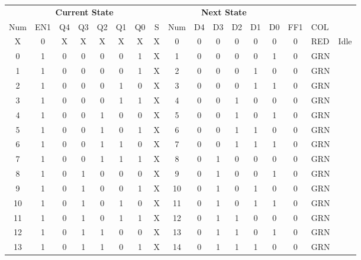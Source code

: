 \begin{table*}
\begin{tabularx}{\linewidth}{ c c c c c c c c | c c c c c c | c l l}
  \multicolumn{8}{c|}{\textbf{Current State}} & \multicolumn{6}{c|}{\textbf{Next State}} &     &           & \\
  Num & EN1 & Q4 & Q3 & Q2 & Q1 & Q0 & S      & Num & D4 & D3 & D2 & D1 & D0             & FF1 & COL & \\ \hline
    X &   0 &  X &  X &  X &  X &  X & X      &   0 &  0 &  0 &  0 &  0 &  0             &   0 & RED & Idle \\
    0 &   1 &  0 &  0 &  0 &  0 &  1 & X      &   1 &  0 &  0 &  0 &  0 &  1             &   0 & GRN & \\
    1 &   1 &  0 &  0 &  0 &  0 &  1 & X      &   2 &  0 &  0 &  0 &  1 &  0             &   0 & GRN & \\
    2 &   1 &  0 &  0 &  0 &  1 &  0 & X      &   3 &  0 &  0 &  0 &  1 &  1             &   0 & GRN & \\
    3 &   1 &  0 &  0 &  0 &  1 &  1 & X      &   4 &  0 &  0 &  1 &  0 &  0             &   0 & GRN & \\
    4 &   1 &  0 &  0 &  1 &  0 &  0 & X      &   5 &  0 &  0 &  1 &  0 &  1             &   0 & GRN & \\
    5 &   1 &  0 &  0 &  1 &  0 &  1 & X      &   6 &  0 &  0 &  1 &  1 &  0             &   0 & GRN & \\
    6 &   1 &  0 &  0 &  1 &  1 &  0 & X      &   7 &  0 &  0 &  1 &  1 &  1             &   0 & GRN & \\
    7 &   1 &  0 &  0 &  1 &  1 &  1 & X      &   8 &  0 &  1 &  0 &  0 &  0             &   0 & GRN & \\
    8 &   1 &  0 &  1 &  0 &  0 &  0 & X      &   9 &  0 &  1 &  0 &  0 &  1             &   0 & GRN & \\
    9 &   1 &  0 &  1 &  0 &  0 &  1 & X      &  10 &  0 &  1 &  0 &  1 &  0             &   0 & GRN & \\
   10 &   1 &  0 &  1 &  0 &  1 &  0 & X      &  11 &  0 &  1 &  0 &  1 &  1             &   0 & GRN & \\
   11 &   1 &  0 &  1 &  0 &  1 &  1 & X      &  12 &  0 &  1 &  1 &  0 &  0             &   0 & GRN & \\
   12 &   1 &  0 &  1 &  1 &  0 &  0 & X      &  13 &  0 &  1 &  1 &  0 &  1             &   0 & GRN & \\
   13 &   1 &  0 &  1 &  1 &  0 &  1 & X      &  14 &  0 &  1 &  1 &  1 &  0             &   0 & GRN & \\

\end{tabularx}
\end{table*}
